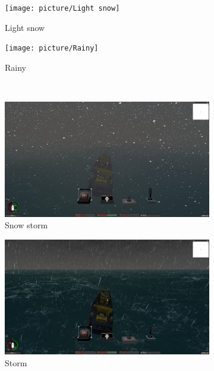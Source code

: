 \documentclass[letterpaper,10pt]{article}
\begin{document}
\begin{figure}[htbp]
\begin{subfigure}{0.3\textwidth}
						\texttt{[image: picture/Light snow]}
						\captionsetup{font=scriptsize}
						\caption{Light snow}
						\label{fig: Light snow}
					\end{subfigure}
					\begin{subfigure}{0.3\textwidth}
						\texttt{[image: picture/Rainy]}
						\captionsetup{font=scriptsize}
						\caption{Rainy}
						\label{fig: Rainy}
					\end{subfigure}\\
					\begin{subfigure}{0.3\textwidth}
						\includegraphics[width=\linewidth]{picture/Snow storm}
						\captionsetup{font=scriptsize}
						\caption{Snow storm}
						\label{fig: Snow storm}	
					\end{subfigure}
					\begin{subfigure}{0.3\textwidth}
						\includegraphics[width=\linewidth]{picture/Storm}
						\captionsetup{font=scriptsize}
						\caption{Storm}
						\label{fig: Storm}	
					\end{subfigure}
					\begin{subfigure}{0.3\textwidth}

\end{subfigure}
\end{figure}
\end{document}
